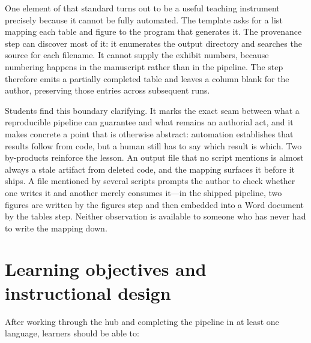 \documentclass[12pt]{article}
\begin{document}
One element of that standard turns out to be a useful teaching
instrument precisely because it cannot be fully automated. The template
asks for a list mapping each table and figure to the program that
generates it. The provenance step can discover most of it: it enumerates
the output directory and searches the source for each filename. It
cannot supply the exhibit numbers, because numbering happens in the
manuscript rather than in the pipeline. The step therefore emits a
partially completed table and leaves a column blank for the author,
preserving those entries across subsequent runs.

Students find this boundary clarifying. It marks the exact seam between
what a reproducible pipeline can guarantee and what remains an authorial
act, and it makes concrete a point that is otherwise abstract: automation
establishes that results follow from code, but a human still has to say
which result is which. Two by-products reinforce the lesson. An output
file that no script mentions is almost always a stale artifact from
deleted code, and the mapping surfaces it before it ships. A file
mentioned by several scripts prompts the author to check whether one
writes it and another merely consumes it---in the shipped pipeline, two
figures are written by the figures step and then embedded into a Word
document by the tables step. Neither observation is available to someone
who has never had to write the mapping down.

\section{Learning objectives and instructional design}
\label{sec:design}

After working through the hub and completing the pipeline in at least one
language, learners should be able to:
\end{document}
